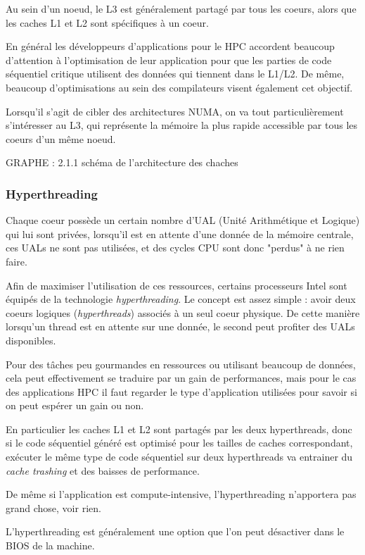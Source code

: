 Au sein d'un noeud, le L3 est généralement partagé par tous les coeurs, alors que les caches L1 et L2 sont spécifiques à un coeur.

En général les développeurs d'applications pour le HPC accordent beaucoup d'attention à l'optimisation de leur application pour que les parties de code séquentiel critique utilisent des données qui tiennent dans le L1/L2.
De même, beaucoup d'optimisations au sein des compilateurs visent également cet objectif.

Lorsqu'il s'agit de cibler des architectures NUMA, on va tout particulièrement s'intéresser au L3, qui représente la mémoire la plus rapide accessible par tous les coeurs d'un même noeud.

GRAPHE : 2.1.1 schéma de l'architecture des chaches

\subsubsection{Hyperthreading}

Chaque coeur possède un certain nombre d'UAL (Unité Arithmétique et Logique) qui lui sont privées, lorsqu'il est en attente d'une donnée de la mémoire centrale, ces UALs ne sont pas utilisées, et des cycles CPU sont donc "perdus" à ne rien faire.

Afin de maximiser l'utilisation de ces ressources, certains processeurs Intel sont équipés de la technologie \emph{hyperthreading}.
Le concept est assez simple : avoir deux coeurs logiques (\emph{hyperthreads}) associés à un seul coeur physique.
De cette manière lorsqu'un thread est en attente sur une donnée, le second peut profiter des UALs disponibles.

Pour des tâches peu gourmandes en ressources ou utilisant beaucoup de données, cela peut effectivement se traduire par un gain de performances, mais pour le cas des applications HPC il faut regarder le type d'application utilisées pour savoir si on peut espérer un gain ou non.

En particulier les caches L1 et L2 sont partagés par les deux hyperthreads, donc si le code séquentiel généré est optimisé pour les tailles de caches correspondant, exécuter le même type de code séquentiel sur deux hyperthreads va entrainer du \emph{cache trashing} et des baisses de performance.

De même si l'application est compute-intensive, l'hyperthreading n'apportera pas grand chose, voir rien.

L'hyperthreading est généralement une option que l'on peut désactiver dans le BIOS de la machine.


